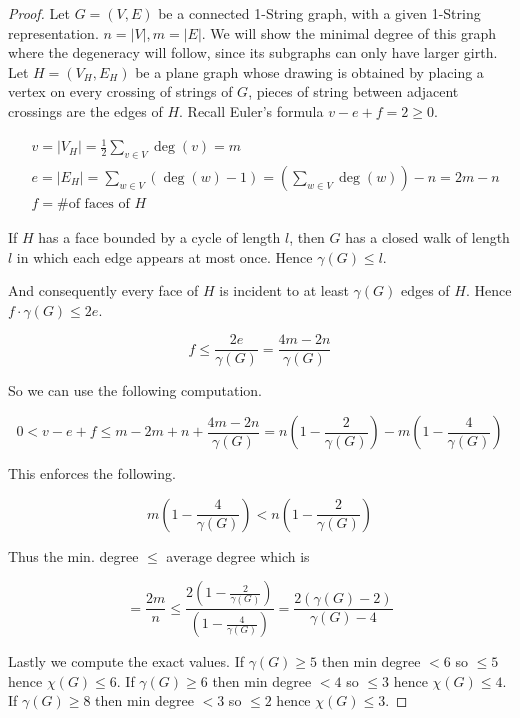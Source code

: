 \begin{proof}
	Let $G = (V,E)$ be a connected 1-String graph, with a given 1-String representation. $n = |V|, m = |E|$. We will show the minimal degree of this graph where the degeneracy will follow, since its subgraphs can only have larger girth. Let $H = (V_H, E_H)$ be a plane graph whose drawing is obtained by placing a vertex on every crossing of strings of $G$, pieces of string between adjacent crossings are the edges of $H$. Recall Euler's formula $v - e + f = 2 \geq 0$.
	
	$$
	\begin{aligned}
		&v = |V_H| = \frac{1}{2} \sum_{v \in V} \deg(v) = m \\
		&e = |E_H| = \sum_{w \in V}(\deg(w) - 1) = \left(\sum_{w \in V} \deg (w)\right) - n = 2m - n \\
		&f = \text{\# of faces of } H
	\end{aligned}
	$$
	
	\begin{observ}
		If $H$ has a face bounded by a cycle of length $l$, then $G$ has a closed walk of length $l$ in which each edge appears at most once. Hence $\gamma(G) \leq l$.
	\end{observ}
	
	And consequently every face of $H$ is incident to at least $\gamma(G)$ edges of $H$. Hence $f \cdot \gamma(G) \leq 2 e$.
	
	$$
	f \leq \frac{2e}{\gamma(G)} = \frac{4m - 2n}{\gamma(G)}
	$$
	
	So we can use the following computation.
	
	$$
	0 < v - e + f \leq m - 2m + n + \frac{4m - 2n}{\gamma(G)} = n \left(1 - \frac{2}{\gamma(G)} \right) - m \left(1 - \frac{4}{\gamma(G)} \right)
	$$
	
	\noindent This enforces the following.
	
	$$
	m \left(1 - \frac{4}{\gamma(G)}\right) < n \left(1 - \frac{2}{\gamma(G)} \right)
	$$
	
	\noindent Thus the min. degree $\leq$ average degree which is
	
	$$
	= \frac{2m}{n} \leq \frac{2 \left(1 - \frac{2}{\gamma(G)} \right)}{\left(1 - \frac{4}{\gamma(G)}\right)} = \frac{2 (\gamma(G) -2)}{\gamma(G) - 4}
	$$
	
	\noindent Lastly we compute the exact values. If $\gamma(G) \geq 5$ then min degree $< 6$ so $\leq 5$ hence $\chi(G) \leq 6$. If $\gamma(G) \geq 6$ then min degree $< 4$ so $\leq 3$ hence $\chi(G) \leq 4$. If $\gamma(G) \geq 8$ then min degree $< 3$ so $\leq 2$ hence $\chi(G) \leq 3$.
\end{proof}

